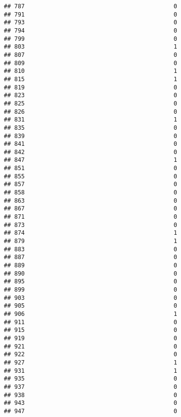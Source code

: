\documentclass[
]{article}
\begin{document}
\begin{verbatim}
## 787                                           0
## 791                                           0
## 793                                           0
## 794                                           0
## 799                                           0
## 803                                           1
## 807                                           0
## 809                                           0
## 810                                           1
## 815                                           1
## 819                                           0
## 823                                           0
## 825                                           0
## 826                                           0
## 831                                           1
## 835                                           0
## 839                                           0
## 841                                           0
## 842                                           0
## 847                                           1
## 851                                           0
## 855                                           0
## 857                                           0
## 858                                           0
## 863                                           0
## 867                                           0
## 871                                           0
## 873                                           0
## 874                                           1
## 879                                           1
## 883                                           0
## 887                                           0
## 889                                           0
## 890                                           0
## 895                                           0
## 899                                           0
## 903                                           0
## 905                                           0
## 906                                           1
## 911                                           0
## 915                                           0
## 919                                           0
## 921                                           0
## 922                                           0
## 927                                           1
## 931                                           1
## 935                                           0
## 937                                           0
## 938                                           0
## 943                                           0
## 947                                           0

\end{verbatim}
\end{document}
